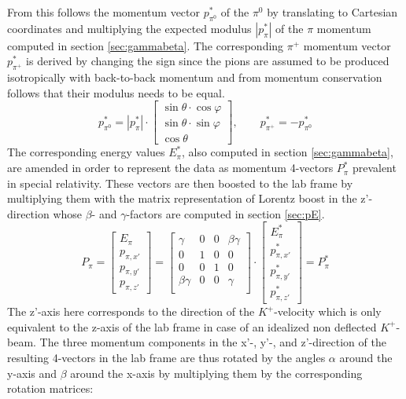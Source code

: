 \documentclass[a4paper,parskip,11pt, DIV12]{scrreprt}
\begin{document}
From this follows the momentum vector $p^*_{\pi^0}$ of the $\pi^0$ by translating to Cartesian coordinates and multiplying the expected modulus $|p^*_{\pi}|$ of the $\pi$ momentum computed in section \ref{sec:gammabeta}. The corresponding $\pi^+$ momentum vector $p^*_{\pi^+}$ is derived by changing the sign since the pions are assumed to be produced isotropically with back-to-back momentum and from momentum conservation follows that their modulus needs to be equal. 
	\begin{equation}
		p^*_{\pi^0} = |p^*_{\pi}| \cdot \begin{bmatrix}
			\sin\theta \cdot \cos\varphi \\ \sin\theta \cdot \sin\varphi \\ \cos\theta
		\end{bmatrix}
		, \quad \quad p^*_{\pi^+} = -p^*_{\pi^0}
	\end{equation}
	The corresponding energy values $E^*_{\pi}$, also computed in section \ref{sec:gammabeta}, are amended in order to represent the data as momentum 4-vectors $P^*_{\pi}$  prevalent in special relativity. These vectors are then boosted to the lab frame by multiplying them with the matrix representation of Lorentz boost in the z'-direction whose $\beta$- and $\gamma$-factors are computed in section \ref{sec:pE}.
	\begin{equation}
		P_{\pi} = 
		\begin{bmatrix}
			E_{\pi} \\ p_{\pi,x'} \\ p_{\pi,y'} \\ p_{\pi,z'}
		\end{bmatrix}
		=
		\begin{bmatrix}
			\gamma & 0 & 0 & \beta \gamma \\
			0 & 1 & 0 & 0 \\
			0 & 0 & 1 & 0\\
			\beta \gamma & 0 & 0 & \gamma \\
		\end{bmatrix}
		\cdot
		\begin{bmatrix}
			E_{\pi}^* \\ p_{\pi,x'}^* \\ p_{\pi,y'}^* \\ p_{\pi,z'}^*
		\end{bmatrix} = P^*_{\pi}
	\end{equation}
	The z'-axis here corresponds to the direction of the $K^+$-velocity which is only equivalent to the z-axis of the lab frame in case of an idealized non deflected $K^+$-beam. The three momentum components in the x'-, y'-, and z'-direction of the resulting 4-vectors in the lab frame are thus rotated by the angles $\alpha$ around the y-axis and $\beta$ around the x-axis by multiplying them by the corresponding rotation matrices:
\end{document}
